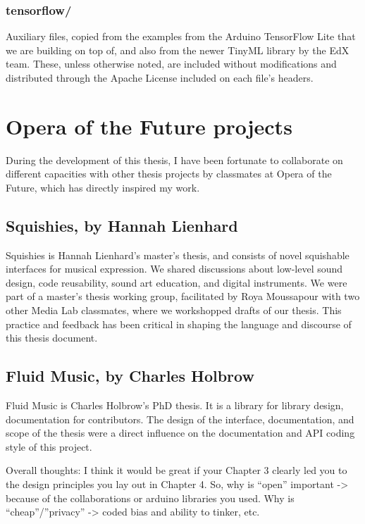 \subsubsection{tensorflow/}

Auxiliary files, copied from the examples from the Arduino TensorFlow Lite that we are building on top of, and also from the newer TinyML library by the EdX team. These, unless otherwise noted, are included without modifications and distributed through the Apache License included on each file's headers.

\section{Opera of the Future projects}

During the development of this thesis, I have been fortunate to collaborate on different capacities with other thesis projects by classmates at Opera of the Future, which has directly inspired my work.

\subsection{Squishies, by Hannah Lienhard}

Squishies is Hannah Lienhard's master's thesis, and consists of novel squishable interfaces for musical expression. We shared discussions about low-level sound design, code reusability, sound art education, and digital instruments. We were part of a master's thesis working group, facilitated by Roya Moussapour with two other Media Lab classmates, where we workshopped drafts of our thesis. This practice and feedback has been critical in shaping the language and discourse of this thesis document.

\subsection{Fluid Music, by Charles Holbrow}

Fluid Music is Charles Holbrow's PhD thesis. It is a library for library design, documentation for contributors. The design of the interface, documentation, and scope of the thesis were a direct influence on the documentation and API coding style of this project.

Overall thoughts: I think it would be great if your Chapter 3 clearly led you to the design principles you lay out in Chapter 4. So, why is “open” important -> because of the collaborations or arduino libraries you used. Why is “cheap”/”privacy” -> coded bias and ability to tinker, etc.
